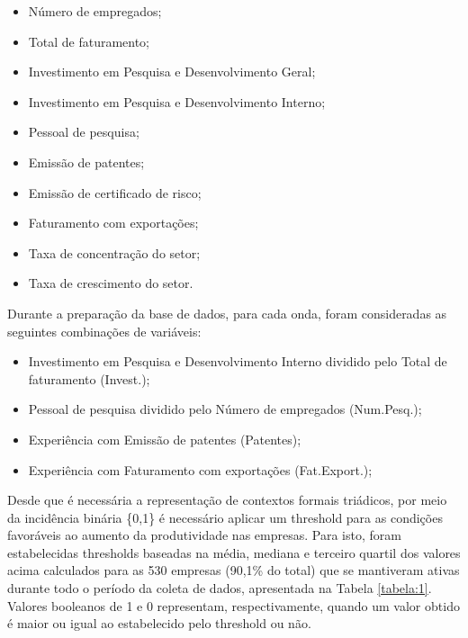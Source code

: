 \documentclass[12pt]{article}
\begin{document}
\begin{itemize}
    \item Número de empregados;
    \item Total de faturamento;
    \item Investimento em Pesquisa e Desenvolvimento Geral;
    \item Investimento em Pesquisa e Desenvolvimento Interno;
    \item Pessoal de pesquisa;
    \item Emissão de patentes;
    \item Emissão de certificado de risco;
    \item Faturamento com exportações;
    \item Taxa de concentração do setor;
    \item Taxa de crescimento do setor.
\end{itemize}


Durante a preparação da base de dados, para cada onda, foram consideradas as seguintes combinações de variáveis:

\begin{itemize}
    \item Investimento em Pesquisa e Desenvolvimento Interno dividido pelo Total de faturamento (Invest.);
    \item Pessoal de pesquisa dividido pelo Número de empregados (Num.Pesq.);
    \item Experiência com Emissão de patentes (Patentes);
    \item Experiência com Faturamento com exportações (Fat.Export.);
\end{itemize}

Desde que é necessária a representação de contextos formais triádicos, por meio da incidência binária \{0,1\} é necessário aplicar um threshold para as condições favoráveis ao aumento da produtividade nas empresas. Para isto, foram estabelecidas thresholds baseadas na média, mediana e terceiro quartil dos valores acima calculados para as 530 empresas (90,1\% do total) que se mantiveram ativas durante todo o período da coleta de dados, apresentada na Tabela \ref{tabela:1}. Valores booleanos de 1 e 0 representam, respectivamente, quando um valor obtido é maior ou igual ao estabelecido pelo threshold ou não. 
\end{document}
